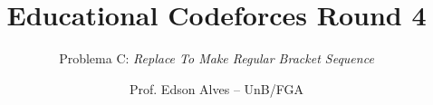 \title{Educational Codeforces Round 4}
\subtitle{Problema C: \textit{Replace To Make Regular Bracket Sequence}}
\author{Prof. Edson Alves -- UnB/FGA}
\date{}
